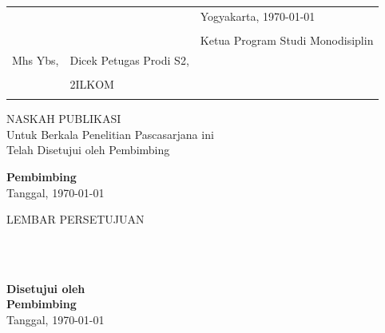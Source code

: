 \vspace{1cm}
\renewcommand{\arraystretch}{1}
\begin{tabular}{p{4cm}p{5cm}p{6cm}}
&							& Yogyakarta, \today \\
&							& \\
&							& Ketua Program Studi Monodisiplin \\
Mhs Ybs,		& Dicek Petugas Prodi S2,	& \@program \\
				&							& \\ [1.5cm]
\@fullname 		& \@adminS2ILKOM			& \underline{\@headprogram} \\
				&							& \@headprogramnip
\end{tabular}
\restoregeometry


\newpage
\begin{singlespace}
\begin{center}
\large{NASKAH PUBLIKASI} \\

\vspace{5cm}
Untuk Berkala Penelitian Pascasarjana ini \\
Telah Disetujui oleh Pembimbing \\
\end{center}

\vspace{8cm}
\noindent
\textbf{Pembimbing} \\

\vspace{1.5cm}
\noindent
\textbf{\underline{\@firstsupervisor}} \hfill Tanggal, \today  \\
\textbf{\@firstsupervisornip}
\end{singlespace}

\newpage
\begin{singlespace}
\begin{center}
\large{LEMBAR PERSETUJUAN} \\

\vspace{2.5cm}
\normalfont\@titleind \par\nobreak

\vspace{5cm}
\underline{\@fullname} \\
\@idnum \\
\end{center}

\vspace{4cm}
\noindent
\textbf{Disetujui oleh} \\
\textbf{Pembimbing} \\

\vspace{1.5cm}
\noindent
\textbf{\underline{\@firstsupervisor}} \hfill Tanggal, \today \\
\textbf{\@firstsupervisornip}
\end{singlespace}

